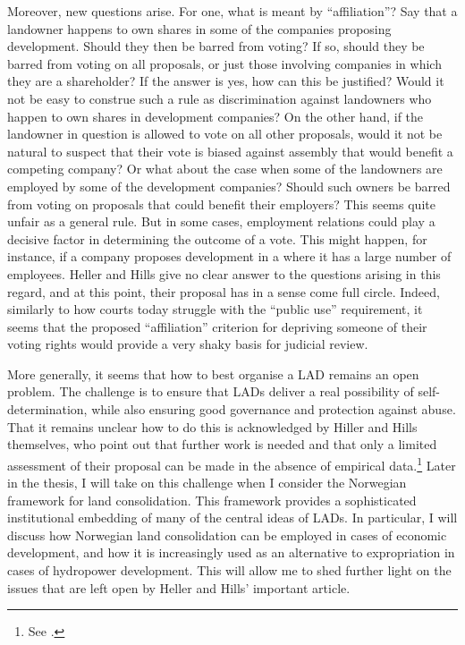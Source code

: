 Moreover, new questions arise. For one, what is meant by ``affiliation''? Say that a landowner happens to own shares in some of the companies proposing development. Should they then be barred from voting? If so, should they be barred from voting on all proposals, or just those involving companies in which they are a shareholder? If the answer is yes, how can this be justified? Would it not be easy to construe such a rule as discrimination against landowners who happen to own shares in development companies? On the other hand, if the landowner in question is allowed to vote on all other proposals, would it not be natural to suspect that their vote is biased against assembly that would benefit a competing company? Or what about the case when some of the landowners are employed by some of the development companies? Should such owners be barred from voting on proposals that could benefit their employers? This seems quite unfair as a general rule. But in some cases, employment relations could play a decisive factor in determining the outcome of a vote. This might happen, for instance, if a company proposes development in a  where it has a large number of employees. Heller and Hills give no clear answer to the questions arising in this regard, and at this point, their proposal has in a sense come full circle. Indeed, similarly to how courts today struggle with the ``public use'' requirement, it seems that the proposed ``affiliation'' criterion for depriving someone of their voting rights would provide a very shaky basis for judicial review.

More generally, it seems that how to best organise a LAD remains an open problem. The challenge is to ensure that LADs deliver a real possibility of self-determination, while also ensuring good governance and protection against abuse. That it remains unclear how to do this is acknowledged by Hiller and Hills themselves, who point out that further work is needed and that only a limited assessment of their proposal can be made in the absence of empirical data.\footnote{See \cite[]{heller08}.} Later in the thesis, I will take on this challenge when I consider the Norwegian framework for land consolidation. This framework provides a sophisticated institutional embedding of many of the central ideas of LADs. In particular, I will discuss how Norwegian land consolidation can be employed in cases of economic development, and how it is increasingly used as an alternative to expropriation in cases of hydropower development. This will allow me to shed further light on the issues that are left open by Heller and Hills' important article.

